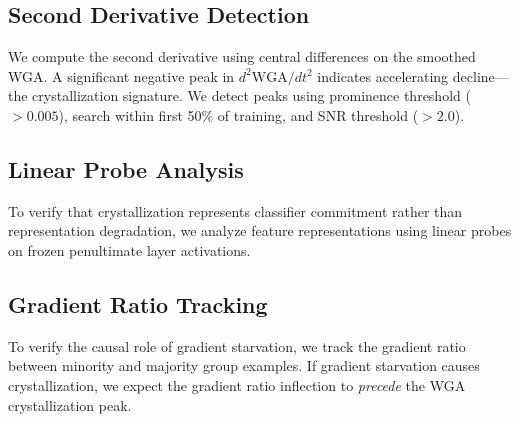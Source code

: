 \subsection{Second Derivative Detection}

We compute the second derivative using central differences on the smoothed WGA. A significant negative peak in $d^2\text{WGA}/dt^2$ indicates accelerating decline---the crystallization signature. We detect peaks using prominence threshold ($>0.005$), search within first 50\% of training, and SNR threshold ($>2.0$).

\subsection{Linear Probe Analysis}

To verify that crystallization represents classifier commitment rather than representation degradation, we analyze feature representations using linear probes on frozen penultimate layer activations.

\subsection{Gradient Ratio Tracking}

To verify the causal role of gradient starvation, we track the gradient ratio between minority and majority group examples. If gradient starvation causes crystallization, we expect the gradient ratio inflection to \emph{precede} the WGA crystallization peak.
